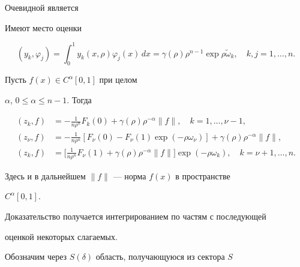 Очевидной является





\begin{lem}


Имеют место оценки


$$


(y_k,\varphi_j)=\int_0^1y_k(x,\rho)\varphi_j(x)\,dx=


\gamma(\rho)\rho^{n-1}\exp\rho\widetilde\omega_k,\quad k,j=1,\dotsc,n.


$$


\end{lem}





\begin{lem}


Пусть $f(x)\in C^\alpha[0,1]$ при целом


$\alpha$, $0\le\alpha\le n-1$. Тогда


\begin{align*}


(z_k,f)&=- \frac 1{n\rho^n}F_k(0)+\gamma(\rho)\rho^{-\alpha}


\|f\|,\quad k=1,\dotsc,\nu-1, \\


%


(z_\nu,f)&=- \frac 1{n\rho^n}[F_\nu(0)-F_\nu(1)\exp(-\rho\omega_\nu)]


+\gamma(\rho)\rho^{-\alpha}\|f\|, \\


%


(z_k,f)&=\bigg[ \frac 1{n\rho^n}F_{\nu}(1)+\gamma(\rho)\rho^


{-\alpha}\|f\|\bigg]\exp(-\rho\omega_k),\quad k=\nu+1,\dotsc,n.


\end{align*}


Здесь и в дальнейшем $\|f\|$ --- норма $f(x)$ в пространстве


$C^\alpha[0,1]$.


\end{lem}





Доказательство получается интегрированием по частям с последующей


оценкой некоторых слагаемых.





Обозначим через $S(\delta)$ область, получающуюся из сектора $S$


